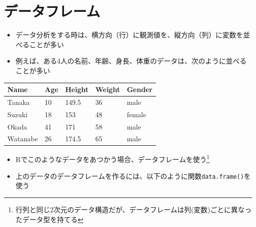 \documentclass[
]{book}
\providecommand{\tightlist}{%
  \setlength{\itemsep}{0pt}\setlength{\parskip}{0pt}}
\begin{document}
\hypertarget{ux30c7ux30fcux30bfux30d5ux30ecux30fcux30e0}{%
\section{データフレーム}\label{ux30c7ux30fcux30bfux30d5ux30ecux30fcux30e0}}

\begin{itemize}
\tightlist
\item
  データ分析をする時は、横方向（行）に観測値を、縦方向（列）に変数を並べることが多い
\item
  例えば、ある4人の名前、年齢、身長、体重のデータは、次のように並べることが多い
\end{itemize}

\begin{longtable}[]{@{}lllll@{}}
\toprule()
Name & Age & Height & Weight & Gender \\
\midrule()
\endhead
Tanaka & 10 & 149.5 & 36 & male \\
Suzuki & 18 & 153 & 48 & female \\
Okada & 41 & 171 & 58 & male \\
Watanabe & 26 & 174.5 & 65 & male \\
\bottomrule()
\end{longtable}

\begin{itemize}
\tightlist
\item
  Rでこのようなデータをあつかう場合、データフレームを使う\footnote{行列と同じ2次元のデータ構造だが、データフレームは列(変数)ごとに異なったデータ型を持てる}
\item
  上のデータのデータフレームを作るには、以下のように関数\texttt{data.frame()}を使う
\end{itemize}
\end{document}
